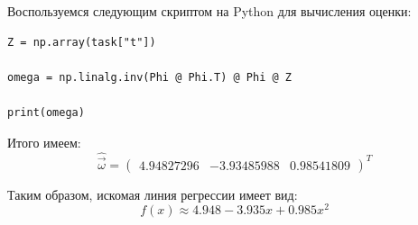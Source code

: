 Воспользуемся следующим скриптом на Python для вычисления оценки: 

\begin{lstlisting}[caption=Расчёт ОМНК]
Z = np.array(task["t"])

omega = np.linalg.inv(Phi @ Phi.T) @ Phi @ Z

print(omega)
\end{lstlisting}

Итого имеем:
\[
    \hat{\vec{\omega}}=\begin{pmatrix}
        4.94827296 & -3.93485988 & 0.98541809
    \end{pmatrix}^T
\]

Таким образом, искомая линия регрессии имеет вид:
\[
f(x) \approx 4.948 - 3.935x + 0.985x^2
\]